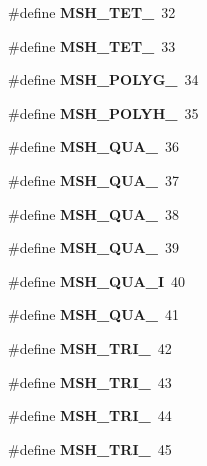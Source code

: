 \begin{DoxyCompactItemize}
\item 
\#define {\bfseries M\-S\-H\-\_\-\-T\-E\-T\-\_}~32\label{GmshDefines_8h_a2c503388756374cae6ad90887d5775ae}

\item 
\#define {\bfseries M\-S\-H\-\_\-\-T\-E\-T\-\_}~33\label{GmshDefines_8h_ab45341405221fc93d5b49675fe9eefe4}

\item 
\#define {\bfseries M\-S\-H\-\_\-\-P\-O\-L\-Y\-G\-\_\-}~34\label{GmshDefines_8h_a124a7f49f59c1bee701b45571bbf3407}

\item 
\#define {\bfseries M\-S\-H\-\_\-\-P\-O\-L\-Y\-H\-\_\-}~35\label{GmshDefines_8h_a0c43a6831c1e4e0c8ea89f18e2360e12}

\item 
\#define {\bfseries M\-S\-H\-\_\-\-Q\-U\-A\-\_}~36\label{GmshDefines_8h_a15735a3eec9f8a25c4431240d5dcefee}

\item 
\#define {\bfseries M\-S\-H\-\_\-\-Q\-U\-A\-\_}~37\label{GmshDefines_8h_af7ccd74f2728ab65ee6bbd92e20ae3de}

\item 
\#define {\bfseries M\-S\-H\-\_\-\-Q\-U\-A\-\_}~38\label{GmshDefines_8h_acafd43f6ef4f09891fcdb4973e8e2bae}

\item 
\#define {\bfseries M\-S\-H\-\_\-\-Q\-U\-A\-\_}~39\label{GmshDefines_8h_ab78b822e20c9ab149cf6220d29f933f2}

\item 
\#define {\bfseries M\-S\-H\-\_\-\-Q\-U\-A\-\_\-I}~40\label{GmshDefines_8h_a2c44c46cd03682db5362930ea5b72584}

\item 
\#define {\bfseries M\-S\-H\-\_\-\-Q\-U\-A\-\_}~41\label{GmshDefines_8h_a9c4f609775ff266292e4f5e4b672ab11}

\item 
\#define {\bfseries M\-S\-H\-\_\-\-T\-R\-I\-\_}~42\label{GmshDefines_8h_a366bc1d184c0907e2390657ee10c9ec2}

\item 
\#define {\bfseries M\-S\-H\-\_\-\-T\-R\-I\-\_}~43\label{GmshDefines_8h_a16cbbbe7bad3e47e304a26b5f9802fdd}

\item 
\#define {\bfseries M\-S\-H\-\_\-\-T\-R\-I\-\_}~44\label{GmshDefines_8h_aa92c593f0f24f01cd90afdcbb6cb1e38}

\item 
\#define {\bfseries M\-S\-H\-\_\-\-T\-R\-I\-\_}~45\label{GmshDefines_8h_a618a02dbb6c322aac65167ecc3abe4e5}


\end{DoxyCompactItemize}
